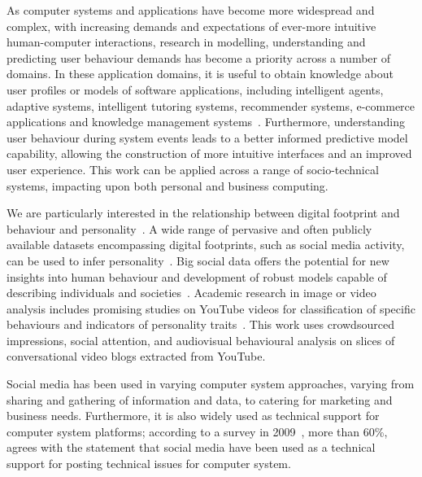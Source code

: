 \documentclass[graybox]{svmult}
\begin{document}
As computer systems and applications have become more widespread and
complex, with increasing demands and expectations of ever-more
intuitive human-computer interactions, research in modelling,
understanding and predicting user behaviour demands has become a
priority across a number of domains.  In these application domains, it
is useful to obtain knowledge about user profiles or models of
software applications, including intelligent agents, adaptive systems,
intelligent tutoring systems, recommender systems, e-commerce
applications and knowledge management
systems~\cite{schiaffino+amandi:2009}. Furthermore, understanding user
behaviour during system events leads to a better informed predictive
model capability, allowing the construction of more intuitive
interfaces and an improved user experience. This work can be applied
across a range of socio-technical systems, impacting upon both
personal and business computing.

We are particularly interested in the relationship between digital
footprint and behaviour and
personality~\citep{oatley+crick:2014,oatley-et-al_dasc2015,blamey-et-al-2012,blamey-et-al-2013}. A
wide range of pervasive and often publicly available datasets
encompassing digital footprints, such as social media activity, can be
used to infer
personality~\citep{lambiotte+kosinski:2014,oatley-et-al-soccogcomp2015}. Big
social data offers the potential for new insights into human behaviour
and development of robust models capable of describing individuals and
societies~\citep{lazer-et-al:2009}. Academic research in image or
video analysis includes promising studies on YouTube videos for
classification of specific behaviours and indicators of personality
traits~\citep{biel+gatica-perez:2012}. This work uses crowdsourced
impressions, social attention, and audiovisual behavioural analysis on
slices of conversational video blogs extracted from YouTube.

Social media has been used in varying computer system approaches,
varying from sharing and gathering of information and data, to
catering for marketing and business needs. Furthermore, it is also
widely used as technical support for computer system platforms;
according to a survey in 2009~\citep{thompson:2009}, more than 60\%,
agrees with the statement that social media have been used as a
technical support for posting technical issues for computer system.

\end{document}
